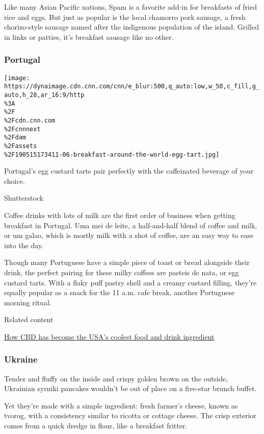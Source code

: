 Like many Asian Pacific nations, Spam is a favorite add-in for
breakfasts of fried rice and eggs. But just as popular is the local
chamorro pork sausage, a fresh chorizo-style sausage named after the
indigenous population of the island. Grilled in links or patties, it's
breakfast sausage like no other.

\hypertarget{portugal}{%
\subsubsection{Portugal}\label{portugal}}

\href{/travel/article/breakfast-food-around-the-world/index.html?gallery=14}{}

\texttt{[image: https://dynaimage.cdn.cnn.com/cnn/e\_blur:500,q\_auto:low,w\_50,c\_fill,g\_auto,h\_28,ar\_16:9/http\\\%3A\\\%2F\\\%2Fcdn.cnn.com\\\%2Fcnnnext\\\%2Fdam\\\%2Fassets\\\%2F190515173411-06-breakfast-around-the-world-egg-tart.jpg]}

Portugal's egg custard tarts pair perfectly with the caffeinated
beverage of your choice.

Shutterstock

Coffee drinks with lots of milk are the first order of business when
getting breakfast in Portugal. Uma mei de leite, a half-and-half blend
of coffee and milk, or um galao, which is mostly milk with a shot of
coffee, are an easy way to ease into the day.

Though many Portuguese have a simple piece of toast or bread alongside
their drink, the perfect pairing for these milky coffees are pasteis de
nata, or egg custard tarts. With a flaky puff pastry shell and a creamy
custard filling, they're equally popular as a snack for the 11 a.m. cafe
break, another Portuguese morning ritual.

Related content

\href{/travel/article/cbd-food-drink-america/index.html}{How CBD has
become the USA's coolest food and drink ingredient}

\hypertarget{ukraine}{%
\subsubsection{Ukraine}\label{ukraine}}

Tender and fluffy on the inside and crispy golden brown on the outside,
Ukrainian syrniki pancakes wouldn't be out of place on a five-star
brunch buffet.

Yet they're made with a simple ingredient: fresh farmer's cheese, known
as tvorog, with a consistency similar to ricotta or cottage cheese. The
crisp exterior comes from a quick dredge in flour, like a breakfast
fritter.

